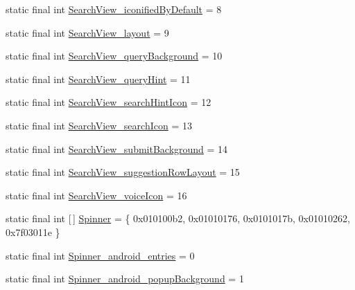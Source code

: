 \begin{DoxyCompactItemize}
\item 
static final int \mbox{\hyperlink{classandroid_1_1support_1_1v7_1_1appcompat_1_1R_1_1styleable_a4bf600d045853eec3e45b543f5095594}{Search\+View\+\_\+iconified\+By\+Default}} = 8
\item 
static final int \mbox{\hyperlink{classandroid_1_1support_1_1v7_1_1appcompat_1_1R_1_1styleable_a8f8459f4043d888686d7e183aa16a33c}{Search\+View\+\_\+layout}} = 9
\item 
static final int \mbox{\hyperlink{classandroid_1_1support_1_1v7_1_1appcompat_1_1R_1_1styleable_a0ce53fa8193fd134754564832aad1748}{Search\+View\+\_\+query\+Background}} = 10
\item 
static final int \mbox{\hyperlink{classandroid_1_1support_1_1v7_1_1appcompat_1_1R_1_1styleable_ab4eafaaa92223b04a9b7ccf85fc6a1ed}{Search\+View\+\_\+query\+Hint}} = 11
\item 
static final int \mbox{\hyperlink{classandroid_1_1support_1_1v7_1_1appcompat_1_1R_1_1styleable_a3010c7f1c74b2e4acf4bd180367d8a99}{Search\+View\+\_\+search\+Hint\+Icon}} = 12
\item 
static final int \mbox{\hyperlink{classandroid_1_1support_1_1v7_1_1appcompat_1_1R_1_1styleable_a00804a6c5d19b7fc675d4619bd28ac1a}{Search\+View\+\_\+search\+Icon}} = 13
\item 
static final int \mbox{\hyperlink{classandroid_1_1support_1_1v7_1_1appcompat_1_1R_1_1styleable_a07a318099f7e9669a82f8a3804296bb5}{Search\+View\+\_\+submit\+Background}} = 14
\item 
static final int \mbox{\hyperlink{classandroid_1_1support_1_1v7_1_1appcompat_1_1R_1_1styleable_a8fe9e4753b8239544327f966749da2af}{Search\+View\+\_\+suggestion\+Row\+Layout}} = 15
\item 
static final int \mbox{\hyperlink{classandroid_1_1support_1_1v7_1_1appcompat_1_1R_1_1styleable_acf6e3bc9a9fa2ff39a17969a13f185d1}{Search\+View\+\_\+voice\+Icon}} = 16
\item 
static final int \mbox{[}$\,$\mbox{]} \mbox{\hyperlink{classandroid_1_1support_1_1v7_1_1appcompat_1_1R_1_1styleable_a63a8e6de3d44afcd176eaa79214fd8a5}{Spinner}} = \{ 0x010100b2, 0x01010176, 0x0101017b, 0x01010262, 0x7f03011e \}
\item 
static final int \mbox{\hyperlink{classandroid_1_1support_1_1v7_1_1appcompat_1_1R_1_1styleable_a783677be4dd7b37c640a78e9e89c9a22}{Spinner\+\_\+android\+\_\+entries}} = 0
\item 
static final int \mbox{\hyperlink{classandroid_1_1support_1_1v7_1_1appcompat_1_1R_1_1styleable_a756e7d7ebf3758cf9548f0450c558c18}{Spinner\+\_\+android\+\_\+popup\+Background}} = 1

\end{DoxyCompactItemize}
